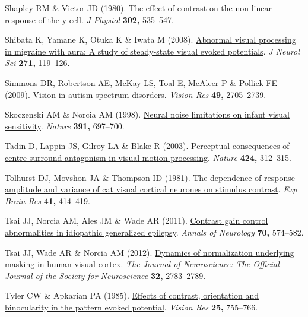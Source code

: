 \documentclass[
  letterpaper,
  DIV=11,
  numbers=noendperiod]{scrartcl}
\newlength{\cslhangindent}
\newenvironment{CSLReferences}[2] %
 {\begin{list}{}{%
  \setlength{\itemindent}{0pt}
  \setlength{\leftmargin}{0pt}
  \setlength{\parsep}{0pt}
  \ifodd #1
   \setlength{\leftmargin}{\cslhangindent}
   \setlength{\itemindent}{-1\cslhangindent}
  \fi
  \setlength{\itemsep}{#2\baselineskip}}}
 {\end{list}}
\begin{document}
\begin{CSLReferences}{1}{1}
Shapley RM \& Victor JD (1980).
\href{https://doi.org/10.1113/jphysiol.1980.sp013259}{The effect of
contrast on the non-linear response of the y cell}. \emph{J Physiol}
\textbf{302,} 535--547.

Shibata K, Yamane K, Otuka K \& Iwata M (2008).
\href{https://doi.org/10.1016/j.jns.2008.04.004}{Abnormal visual
processing in migraine with aura: A study of steady-state visual evoked
potentials}. \emph{J Neurol Sci} \textbf{271,} 119--126.

Simmons DR, Robertson AE, McKay LS, Toal E, McAleer P \& Pollick FE
(2009). \href{https://doi.org/10.1016/j.visres.2009.08.005}{Vision in
autism spectrum disorders}. \emph{Vision Res} \textbf{49,} 2705--2739.

Skoczenski AM \& Norcia AM (1998).
\href{https://doi.org/10.1038/35630}{Neural noise limitations on infant
visual sensitivity}. \emph{Nature} \textbf{391,} 697--700.

Tadin D, Lappin JS, Gilroy LA \& Blake R (2003).
\href{https://doi.org/10.1038/nature01800}{Perceptual consequences of
centre-surround antagonism in visual motion processing}. \emph{Nature}
\textbf{424,} 312--315.

Tolhurst DJ, Movshon JA \& Thompson ID (1981).
\href{https://doi.org/10.1007/BF00238900}{The dependence of response
amplitude and variance of cat visual cortical neurones on stimulus
contrast}. \emph{Exp Brain Res} \textbf{41,} 414--419.

Tsai JJ, Norcia AM, Ales JM \& Wade AR (2011).
\href{https://doi.org/10.1002/ana.22462}{Contrast gain control
abnormalities in idiopathic generalized epilepsy}. \emph{Annals of
Neurology} \textbf{70,} 574--582.

Tsai JJ, Wade AR \& Norcia AM (2012).
\href{https://doi.org/10.1523/JNEUROSCI.4485-11.2012}{Dynamics of
normalization underlying masking in human visual cortex}. \emph{The
Journal of Neuroscience: The Official Journal of the Society for
Neuroscience} \textbf{32,} 2783--2789.

Tyler CW \& Apkarian PA (1985).
\href{https://doi.org/10.1016/0042-6989(85)90183-x}{Effects of contrast,
orientation and binocularity in the pattern evoked potential}.
\emph{Vision Res} \textbf{25,} 755--766.


\end{CSLReferences}
\end{document}
